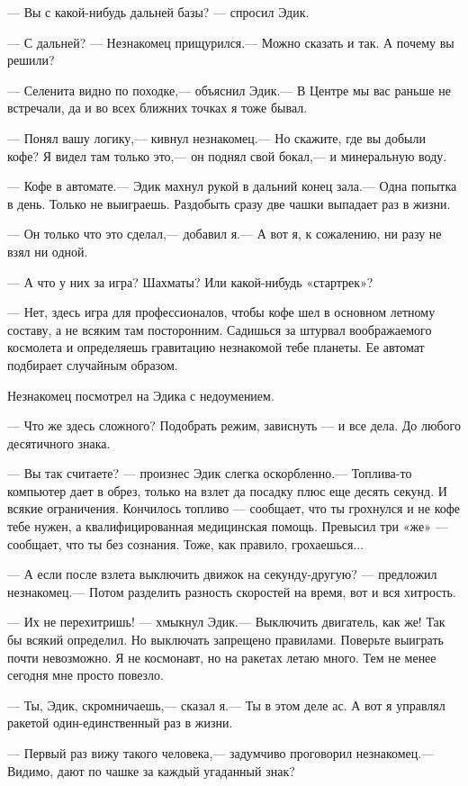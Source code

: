 \documentclass[11pt,a4paper,oneside]{article}
\begin{document}
— Вы с какой-нибудь дальней базы? — спросил Эдик.

— С дальней? — Незнакомец прищурился.— Можно сказать и так. А почему вы решили?

— Селенита видно по походке,— объяснил Эдик.— В Центре мы вас раньше не встречали, да и во всех ближних точках я тоже бывал.

— Понял вашу логику,— кивнул незнакомец.— Но скажите, где вы добыли кофе? Я видел там только это,— он поднял свой бокал,— и минеральную воду.

— Кофе в автомате.— Эдик махнул рукой в дальний конец зала.— Одна попытка в день. Только не выиграешь. Раздобыть сразу две чашки выпадает раз в жизни.

— Он только что это сделал,— добавил я.— А вот я, к сожалению, ни разу не взял ни одной.

— А что у них за игра? Шахматы? Или какой-нибудь «стартрек»?

— Нет, здесь игра для профессионалов, чтобы кофе шел в основном летному составу, а не всяким там посторонним. Садишься за штурвал воображаемого космолета и определяешь гравитацию незнакомой тебе планеты. Ее автомат подбирает случайным образом.

Незнакомец посмотрел на Эдика с недоумением.

— Что же здесь сложного? Подобрать режим, зависнуть — и все дела. До любого десятичного знака.

— Вы так считаете? — произнес Эдик слегка оскорбленно.— Топлива-то компьютер дает в обрез, только на взлет да посадку плюс еще десять секунд. И всякие ограничения. Кончилось топливо — сообщает, что ты грохнулся и не кофе тебе нужен, а квалифицированная медицинская помощь. Превысил три «же» — сообщает, что ты без сознания. Тоже, как правило, грохаешься...

— А если после взлета выключить движок на секунду-другую? — предложил незнакомец.— Потом разделить разность скоростей на время, вот и вся хитрость.

— Их не перехитришь! — хмыкнул Эдик.— Выключить двигатель, как же! Так бы всякий определил. Но выключать запрещено правилами. Поверьте выиграть почти невозможно. Я не космонавт, но на ракетах летаю много. Тем не менее сегодня мне просто повезло.

— Ты, Эдик, скромничаешь,— сказал я.— Ты в этом деле ас. А вот я управлял ракетой один-единственный раз в жизни.

— Первый раз вижу такого человека,— задумчиво проговорил незнакомец.— Видимо, дают по чашке за каждый угаданный знак?
\end{document}
